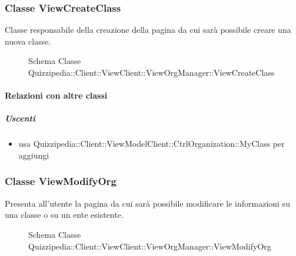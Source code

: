 \subsubsection{Classe ViewCreateClass}
Classe responsabile della creazione della pagina da cui sarà possibile creare una nuova classe.
\begin{figure}[H]
\centering
\noindent{}
\caption[Schema Classe ViewCreateClass]{Schema Classe Quizzipedia::Client::ViewClient::ViewOrgManager::ViewCreateClass}
\end{figure}
\paragraph{Relazioni con altre classi}
\subparagraph{Uscenti}
\begin{itemize}
\item usa Quizzipedia::Client::ViewModelClient::CtrlOrganization::MyClass per aggiungi
\end{itemize}
\subsubsection{Classe ViewModifyOrg}
Presenta all'utente la pagina da cui sarà possibile modificare le informazioni su una classe o su un ente esistente.
\begin{figure}[H]
\centering
\noindent{}
\caption[Schema Classe ViewModifyOrg]{Schema Classe Quizzipedia::Client::ViewClient::ViewOrgManager::ViewModifyOrg}
\end{figure}
